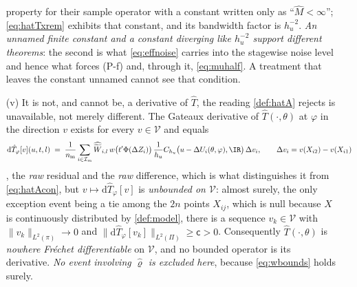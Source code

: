 \begin{proposition}
\begin{enumerate}
property for their sample operator with a constant written only as ``$\hat M<\infty$'';
\eqref{eq:hatTxrem} exhibits that constant, and its bandwidth factor is $h_u^{-2}$. \emph{An unnamed finite
constant and a constant diverging like $h_u^{-2}$ support different theorems}: the second is what
\eqref{eq:effnoise} carries into the stagewise noise level and hence what forces (P-f) and, through it,
\eqref{eq:muhalf}. A treatment that leaves the constant unnamed cannot see that condition.
\item[(v)] It is not, and cannot be, a derivative of $\hat T$, the reading
\cref{def:hatA} rejects is unavailable, not merely different. The Gateaux derivative of
$\hat T(\cdot,\theta)$ at $\varphi$ in the direction $v$ exists for every $v\in\mathcal V$ and equals
\begin{equation}\label{eq:gateaux}
\mathrm d\hat T_\varphi[v](u,t,l)\;=\;\frac1{n_{\mathrm m}}\sum_{i\in\mathcal I_m}
\widehat{\widetilde W}_{i,l}\,w\big(t'\Phi(\Delta Z_i)\big)\,\frac1{h_u}
C_{h_u}\big(u-\Delta U_i(\theta,\varphi),\IR\big)\,\Delta v_i,
\qquad \Delta v_i=v(X_{i2})-v(X_{i1})
\end{equation}
, the \emph{raw} residual and the \emph{raw} difference, which is what distinguishes it from
\eqref{eq:hatAcon}, 
but $v\mapsto\mathrm d\hat T_\varphi[v]$ is \emph{unbounded on $\mathcal V$}: almost surely, the only
exception event being a tie among the $2n$ points $X_{ij}$, which is null because $X$ is continuously
distributed by \cref{def:model}, there is a sequence $v_k\in\mathcal V$ with
$\|v_k\|_{L^{2}(\pi)}\to0$ and $\|\mathrm d\hat T_\varphi[v_k]\|_{L^{2}(\Pi)}\ge\mathsf c>0$.
Consequently $\hat T(\cdot,\theta)$ is \emph{nowhere Fr\'echet differentiable} on $\mathcal V$, and no
bounded operator is its derivative. \emph{No event involving $\hat\varrho$ is excluded here}, because
\eqref{eq:wbounds} holds surely.
\end{enumerate}
\end{proposition}


